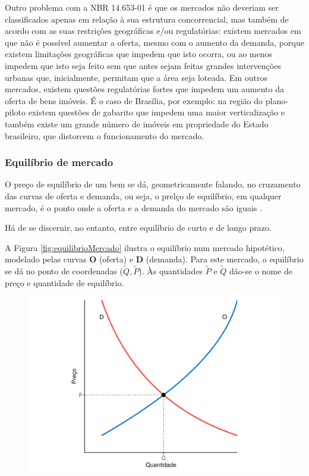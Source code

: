 \documentclass[
	12pt,				%
	oneside,			%
	a4paper,			%
	chapter=TITLE,		%
	section=TITLE,		%
	english,			%
	brazil				%
	]{abntex2}
\begin{document}
\begin{refsection}
Outro problema com a NBR 14.653-01 \autocite*{NBR1465301} é que os mercados não deveriam
ser classificados apenas em relação à sua estrutura concorrencial, mas também de
acordo com as suas restrições geográficas e/ou regulatórias: existem mercados em
que não é possível aumentar a oferta, mesmo com o aumento da demanda, porque
existem limitações geográficas que impedem que isto ocorra, ou ao menos impedem
que isto seja feito sem que antes sejam feitas grandes intervenções urbanas que,
inicialmente, permitam que a área seja loteada. Em outros mercados, existem
questões regulatórias fortes que impedem um aumento da oferta de bens imóveis. É
o caso de Brasília, por exemplo: na região do plano-piloto existem questões de
gabarito que impedem uma maior verticalização e também existe um grande número
de imóveis em propriedade do Estado brasileiro, que distorcem o funcionamento do
mercado.

\hypertarget{equiluxedbrio-de-mercado}{%
\subsubsection{Equilíbrio de mercado}\label{equiluxedbrio-de-mercado}}

O preço de equilíbrio de um bem se dá, geometricamente falando, no cruzamento
das curvas de oferta e demanda, ou seja, o prelço de equilíbrio, em qualquer
mercado, é o ponto onde a oferta e a demanda do mercado são iguais
\autocite[p.~310]{varian}.

Há de se discernir, no entanto, entre equilíbrio de curto e de longo prazo.

A Figura \ref{fig:equilibrioMercado} ilustra o equilíbrio num mercado
hipotético, modelado pelas curvas \textbf{O} (oferta) e \textbf{D} (demanda). Para este
mercado, o equilíbrio se dá no ponto de coordenadas (\(\tilde Q, \tilde P\)). Às
quantidades \(\tilde P\) e \(\tilde Q\) dão-se o nome de preço e quantidade de
equilíbrio.
\begin{figure}[H]

{\centering \includegraphics[width=0.7\linewidth]{images/equilibrioMercado-1} 

}
\end{figure}
\end{refsection}
\end{document}

